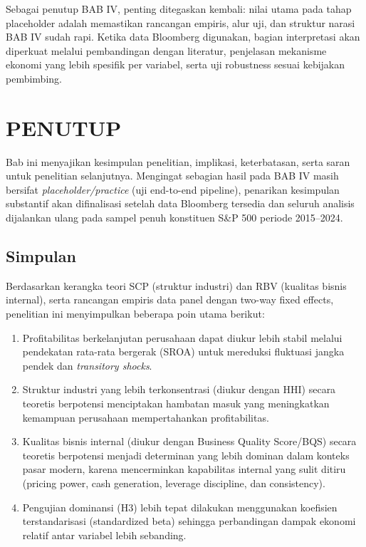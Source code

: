 \documentclass[12pt,a4paper]{report}
\providecommand{\tightlist}{%
  \setlength{\itemsep}{0pt}\setlength{\parskip}{0pt}%
}
\begin{document}
Sebagai penutup BAB IV, penting ditegaskan kembali: nilai utama pada
tahap placeholder adalah memastikan rancangan empiris, alur uji, dan
struktur narasi BAB IV sudah rapi. Ketika data Bloomberg digunakan,
bagian interpretasi akan diperkuat melalui pembandingan dengan
literatur, penjelasan mekanisme ekonomi yang lebih spesifik per
variabel, serta uji robustness sesuai kebijakan pembimbing.

\hypertarget{penutup}{%
\chapter{PENUTUP}\label{penutup}}

Bab ini menyajikan kesimpulan penelitian, implikasi, keterbatasan, serta
saran untuk penelitian selanjutnya. Mengingat sebagian hasil pada BAB IV
masih bersifat \emph{placeholder/practice} (uji end-to-end pipeline),
penarikan kesimpulan substantif akan difinalisasi setelah data Bloomberg
tersedia dan seluruh analisis dijalankan ulang pada sampel penuh
konstituen S\&P 500 periode 2015--2024.

\hypertarget{simpulan}{%
\section{Simpulan}\label{simpulan}}

Berdasarkan kerangka teori SCP (struktur industri) dan RBV (kualitas
bisnis internal), serta rancangan empiris data panel dengan two-way
fixed effects, penelitian ini menyimpulkan beberapa poin utama berikut:

\begin{enumerate}
\def\labelenumi{\arabic{enumi}.}
\tightlist
\item
  Profitabilitas berkelanjutan perusahaan dapat diukur lebih stabil
  melalui pendekatan rata-rata bergerak (SROA) untuk mereduksi fluktuasi
  jangka pendek dan \emph{transitory shocks}.
\item
  Struktur industri yang lebih terkonsentrasi (diukur dengan HHI) secara
  teoretis berpotensi menciptakan hambatan masuk yang meningkatkan
  kemampuan perusahaan mempertahankan profitabilitas.
\item
  Kualitas bisnis internal (diukur dengan Business Quality Score/BQS)
  secara teoretis berpotensi menjadi determinan yang lebih dominan dalam
  konteks pasar modern, karena mencerminkan kapabilitas internal yang
  sulit ditiru (pricing power, cash generation, leverage discipline, dan
  consistency).
\item
  Pengujian dominansi (H3) lebih tepat dilakukan menggunakan koefisien
  terstandarisasi (standardized beta) sehingga perbandingan dampak
  ekonomi relatif antar variabel lebih sebanding.
\end{enumerate}
\end{document}
